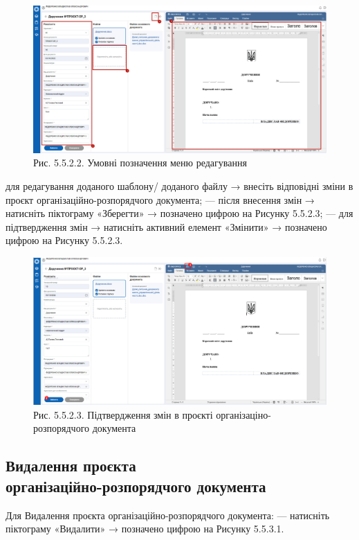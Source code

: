 \begin{figure}[!htbp]
\centerline{\includegraphics[width=\textwidth]{img/5.5.2.2.png}}
\caption{Рис. 5.5.2.2. Умовні позначення меню редагування}
\end{figure}

для редагування доданого шаблону/ доданого файлу → внесіть відповідні зміни в проєкт організаційно-розпорядчого документа;
--- після внесення змін → натисніть піктограму «Зберегти» → позначено цифрою  на Рисунку 5.5.2.3;
--- для підтвердження змін → натисніть активний елемент «Змінити» → позначено цифрою  на Рисунку 5.5.2.3.

\begin{figure}[!htbp]
\centerline{\includegraphics[width=\textwidth]{img/5.5.2.3.png}}
\caption{Рис. 5.5.2.3. Підтвердження змін в проєкті організаціно-розпорядчого документа}
\end{figure}

\subsection{Видалення проєкта \\ організаційно-розпорядчого документа}

Для Видалення проєкта організаційно-розпорядчого документа:
--- натисніть піктограму «Видалити» → позначено цифрою  на Рисунку 5.5.3.1.

